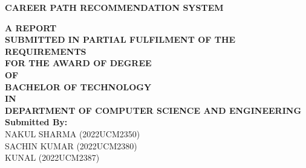 \documentclass[12pt,a4paper]{report}
\begin{document}




\clearpage
\thispagestyle{empty}
\begin{titlepage}
\centering

\vspace*{0cm}

    {\Large \textbf{CAREER PATH RECOMMENDATION SYSTEM}}\\[0.2cm]




\vspace*{1.5cm}

{\normalsize \textbf{A REPORT}}\\[1.5em]

{\normalsize \textbf{SUBMITTED IN PARTIAL FULFILMENT OF THE}}\\[1.2em]

{\normalsize \textbf{REQUIREMENTS}}\\[1.2em]

{\normalsize \textbf{FOR THE AWARD OF DEGREE}}\\[1.em]

{\normalsize \textbf{OF}}\\[1.em]

{\normalsize \textbf{BACHELOR OF TECHNOLOGY}}\\[1.2em]

{\normalsize \textbf{IN}}\\[1.2em]

{\normalsize \textbf{DEPARTMENT OF COMPUTER SCIENCE AND ENGINEERING}}\\[1cm]




{\normalsize \textbf{Submitted By:}}\\[0.5cm]
{\normalsize  NAKUL SHARMA (2022UCM2350)}\\[0.2cm]
{\normalsize  SACHIN KUMAR (2022UCM2380)}\\[0.2cm]
{\normalsize  KUNAL (2022UCM2387)}\\[0.8cm]




\end{titlepage}
\end{document}
